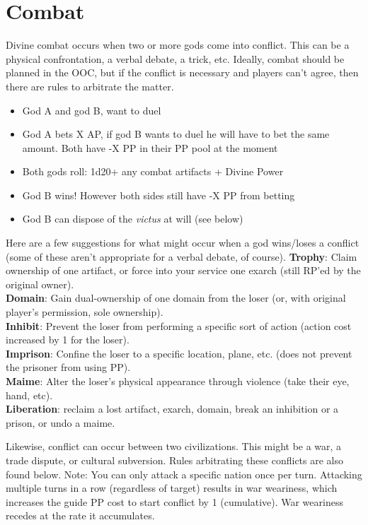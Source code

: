 \documentclass[10pt,a4paper]{article}
\begin{document}
\section*{Combat}
Divine combat occurs when two or more gods come into conflict. This can be a physical confrontation, a verbal debate, a trick, etc. Ideally, combat should be planned in the OOC, but if the conflict is necessary and players can't agree, then there are rules to arbitrate the matter.

\begin{itemize}


\item God A and god B, want to duel
\item God A bets X AP, if god B wants to duel he will have to bet the same amount. Both have -X PP in their PP pool at the moment
\item Both gods roll: 1d20+ any combat artifacts + Divine Power
\item God B wins! However both sides still have -X PP from betting
\item God B can dispose of the \textit{victus} at will (see below)
\end{itemize}

Here are a few suggestions for what might occur when a god wins/loses a conflict (some of these aren't appropriate for a verbal debate, of course).
\textbf{Trophy}: Claim ownership of one artifact, or force into your service one exarch (still RP'ed by the original owner).\\
\textbf{Domain}: Gain dual-ownership of one domain from the loser (or, with original player's permission, sole ownership).\\
\textbf{Inhibit}: Prevent the loser from performing a specific sort of action (action cost increased by 1 for the loser).\\
\textbf{Imprison}: Confine the loser to a specific location, plane, etc. (does not prevent the prisoner from using PP).\\
\textbf{Maime}: Alter the loser's physical appearance through violence (take their eye, hand, etc).\\
\textbf{Liberation}: reclaim a lost artifact, exarch, domain, break an inhibition or a prison, or undo a maime.

Likewise, conflict can occur between two civilizations. This might be a war, a trade dispute, or cultural subversion. Rules arbitrating these conflicts are also found below. Note: You can only attack a specific nation once per turn. Attacking multiple turns in a row (regardless of target) results in war weariness, which increases the guide PP cost to start conflict by 1 (cumulative). War weariness recedes at the rate it accumulates.
\end{document}
